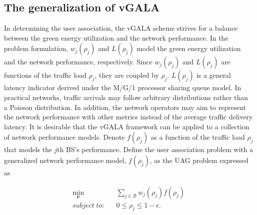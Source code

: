 \documentclass[journal]{IEEEtran}
\theoremstyle{definition}
\begin{document}
\subsection{The generalization of vGALA}
In determining the user association, the vGALA scheme strives for a balance between the green energy utilization and the network performance. In the problem formulation, $w_{j}(\rho_{j})$ and $L(\rho_{j})$ model the green energy utilization and the network performance, respectively. Since $w_{j}(\rho_{j})$ and $L(\rho_{j})$ are functions of the traffic load $\rho_{j}$, they are coupled by $\rho_{j}$. $L(\rho_{j})$ is a general latency indicator derived under the M/G/1 processor sharing queue model. In practical networks, traffic arrivals may follow arbitrary distributions rather than a Poisson distribution. In addition, the network operators may aim to represent the network performance with other metrics instead of the average traffic delivery latency. It is desirable that the vGALA framework can be applied to a collection of network performance models. Denote $f(\rho_{j})$ as a function of the traffic load $\rho_{j}$ that models the $j$th BS's performance. Define the user association problem with a generalized network performance model, $f(\rho_{j})$, as the UAG problem expressed as

\begin{eqnarray}
\label{eq:object_network_goal_general}
\min_{\boldsymbol{\rho}} && \sum_{j \in \mathcal{B}}w_{j}(\rho_{j})f(\rho_{j})\\
\label{eq:constraint_omge_general}
subject\; to: && 0\leq\rho_{j}\leq 1-\epsilon.
\end{eqnarray}
\end{document}
